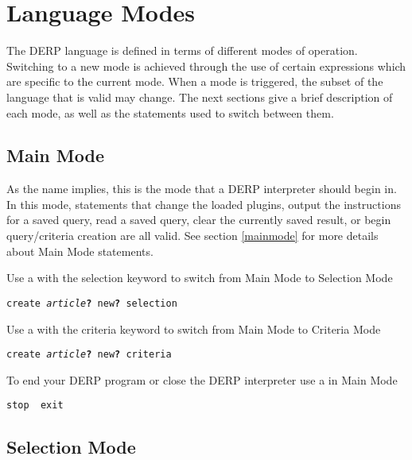 \section{Language Modes}

The DERP language is defined in terms of different modes of operation.
Switching to a new mode is achieved through the use of certain expressions
which are specific to the current mode. When a mode is triggered, the
subset of the language that is valid may change. The next sections give
a brief description of each mode, as well as the statements used to switch between them.


\subsection{Main Mode}

As the name implies, this is the mode that a DERP interpreter should begin in. In this mode,
statements that change the loaded plugins, output the instructions for a saved query, read a
saved query, clear the currently saved result, or begin query/criteria creation are all valid.
See section \ref{mainmode} for more details about Main Mode statements.

Use a  with the selection keyword to switch from Main Mode to Selection Mode
\begin{description}[labelindent=1cm,leftmargin=\onelen,labelwidth=1cm]
     \texttt{create \textit{article}\textbf{?} new\textbf{?} selection}
\end{description}

Use a  with the criteria keyword to switch from Main Mode to Criteria Mode
\begin{description}[labelindent=1cm,leftmargin=\onelen,labelwidth=1cm]
     \texttt{create \textit{article}\textbf{?} new\textbf{?} criteria}
\end{description}

To end your DERP program or close the DERP interpreter use a  in Main Mode
\begin{description}[labelindent=1cm,leftmargin=\onelen,labelwidth=1cm]
     \texttt{stop \textbf{\textbar} exit}
\end{description}

\subsection{Selection Mode}


